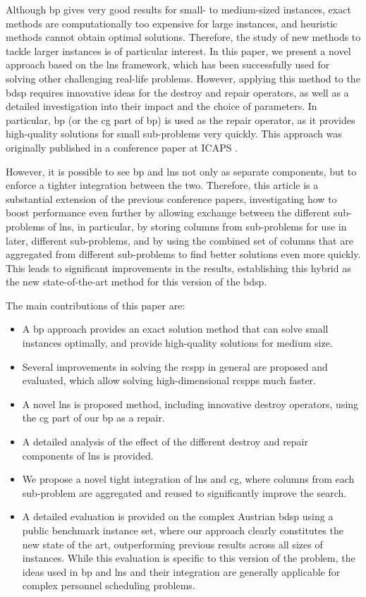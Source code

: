 \documentclass[]{amsart}
\theoremstyle{plain}
\begin{document}
Although \gls{bp} gives very good results for small- to medium-sized instances, exact methods are computationally too expensive for large instances, and heuristic methods cannot obtain optimal solutions. Therefore, the study of new methods to tackle larger instances is of particular interest. In this paper, we present a novel approach based on the \acrfull{lns} framework, which has been successfully used for solving other challenging real-life problems. However, applying this method to the \gls{bdsp} requires innovative ideas for the destroy and repair operators, as well as a detailed investigation into their impact and the choice of parameters. In particular, \gls{bp} (or the \gls{cg} part of \gls{bp}) is used as the repair operator, as it provides high-quality solutions for small sub-problems very quickly. This approach was originally published in a conference paper at ICAPS \cite{mazzoli2024investigating}.

However, it is possible to see \gls{bp} and \gls{lns} not only as separate components, but to enforce a tighter integration between the two. Therefore, this article is a substantial extension of the previous conference papers, investigating how to boost performance even further by allowing exchange between the different sub-problems of \gls{lns}, in particular, by storing columns from sub-problems for use in later, different sub-problems, and by using the combined set of columns that are aggregated from different sub-problems to find better solutions even more quickly. This leads to significant improvements in the results, establishing this hybrid as the new state-of-the-art method for this version of the \gls{bdsp}.
 
The main contributions of this paper are:
\begin{itemize}
    \item A \acrfull{bp} approach provides an exact solution method that can solve small instances optimally, and provide high-quality solutions for medium size.
    \item Several improvements in solving the \acrfull{rcspp} in general are proposed and evaluated, which allow solving high-dimensional \glspl{rcspp} much faster.
	\item A novel \acrfull{lns} is proposed method, including innovative destroy operators, using the \gls{cg} part of our \gls{bp} as a repair.
    \item A detailed analysis of the effect of the different destroy and repair components of \gls{lns} is provided.
    \item We propose a novel tight integration of \gls{lns} and \gls{cg}, where columns from each sub-problem are aggregated and reused to significantly improve the search.
    \item A detailed evaluation is provided on the complex Austrian \gls{bdsp} using a public benchmark instance set, where our approach clearly constitutes the new state of the art, outperforming previous results across all sizes of instances. While this evaluation is specific to this version of the problem, the ideas used in \gls{bp} and \gls{lns} and their integration are generally applicable for complex personnel scheduling problems. 
\end{itemize}
\end{document}
